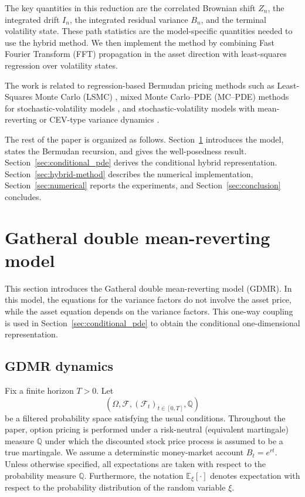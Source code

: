 \documentclass[pdflatex,sn-mathphys-num]{sn-jnl}
\theoremstyle{thmstyleone}%
\theoremstyle{thmstylethree}%
\theoremstyle{thmstyletwo}%
\newcommand{\E}{\mathbb E}
\newcommand{\Q}{\mathbb Q}
\newcommand{\F}{\mathcal F}
\begin{document}
The key quantities in this reduction are the correlated Brownian shift $Z_n$,
the integrated drift $I_n$, the integrated residual variance $B_n$, and the
terminal volatility state. These path statistics are the model-specific
quantities needed to use the hybrid method. We then implement the method by
combining Fast Fourier Transform (FFT) propagation in the asset direction with
least-squares regression over volatility states.

The work is related to regression-based Bermudan pricing methods such as
Least-Squares Monte Carlo (LSMC)
\cite{longstaff2001valuing,tsitsiklis2001regression,clement2002analysis},
mixed Monte Carlo--PDE (MC--PDE) methods for stochastic-volatility models
\cite{loeper2009mixed,lipp2013mixing,cozma2017mixed,farahany2020mixing}, and
stochastic-volatility models with mean-reverting or CEV-type variance dynamics
\cite{heston1993closedform,cir1985termstructure,gatheral2006volsurface,
bayer2013fast,cox1975cev,chan1992empirical,yamada1971uniqueness,
mishura2025gatheral}.

The rest of the paper is organized as follows. Section~\ref{sec:model}
introduces the model, states the Bermudan recursion, and gives the
well-posedness result. Section~\ref{sec:conditional_pde} derives the conditional
hybrid representation. Section~\ref{sec:hybrid-method} describes the numerical
implementation, Section~\ref{sec:numerical} reports the experiments, and
Section~\ref{sec:conclusion} concludes.



\section{Gatheral double mean-reverting model}\label{sec:model}

This section introduces the Gatheral double mean-reverting model (GDMR). In this model, the equations for the variance factors do not involve the asset price, while
the asset equation depends on the variance factors. This one-way coupling is
used in Section~\ref{sec:conditional_pde} to obtain the conditional
one-dimensional representation.

\subsection{GDMR dynamics}

Fix a finite horizon $T>0$. Let
$$
(\Omega,\F,(\F_t)_{t\in[0,T]},\Q)
$$
be a filtered probability space satisfying the usual conditions.  Throughout the paper, option pricing is performed under a risk-neutral (equivalent martingale) measure $\Q$ under which the discounted stock price process is assumed to be a true martingale. We assume a determinstic money-market account $B_t=e^{rt}$. Unless otherwise specified, all expectations are taken with respect to the probability measure $\Q$. Furthermore, the notation $\E_\xi[\cdot]$ denotes expectation with respect to the probability distribution of the random variable $\xi$.
\end{document}
